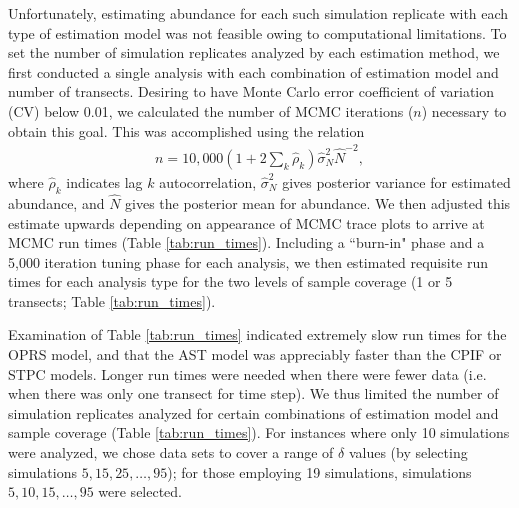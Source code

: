 \documentclass[12pt,fleqn]{article}
\begin{document}
\begin{flushleft}
\hspace{.5in} Unfortunately, estimating abundance for each such simulation replicate with each type of estimation model was not feasible owing to computational limitations.  To set the number of simulation replicates analyzed by each estimation method, we first conducted a single analysis with each combination of estimation model and number of transects.  Desiring to have Monte Carlo error coefficient of variation (CV) below 0.01, we calculated the number of MCMC iterations ($n$) necessary to obtain this goal.  This was accomplished using the relation
\begin{eqnarray*}
  n = 10,000(1+2 \sum_k \hat{\rho}_k)\hat{\sigma}_N^2 \hat{N}^{-2},
\end{eqnarray*}
where $\hat{\rho}_k$ indicates lag $k$ autocorrelation, $\hat{\sigma}_N^2$ gives posterior variance for
estimated abundance, and $\hat{N}$ gives the posterior mean for abundance.  We then adjusted this estimate upwards depending on appearance of MCMC trace plots to arrive at MCMC run times (Table \ref{tab:run_times}). Including a ``burn-in" phase and a 5,000 iteration tuning phase for each analysis, we then estimated requisite run times for each analysis type for the two levels of sample coverage (1 or 5 transects; Table \ref{tab:run_times}).



\hspace{.5in} Examination of Table \ref{tab:run_times} indicated extremely slow run times for the OPRS model, and that the AST model was appreciably faster than the CPIF or STPC models.  Longer run times were needed when there were fewer data (i.e. when there was only one transect for time step).  We thus limited the number of simulation replicates analyzed for certain combinations of estimation model and sample coverage (Table \ref{tab:run_times}).  For instances where only 10 simulations were analyzed, we chose data sets to cover a range of $\delta$ values (by selecting simulations $5, 15, 25, \hdots, 95$); for those employing 19 simulations, simulations $5, 10, 15, \hdots, 95$ were selected.


\end{flushleft}
\end{document}
